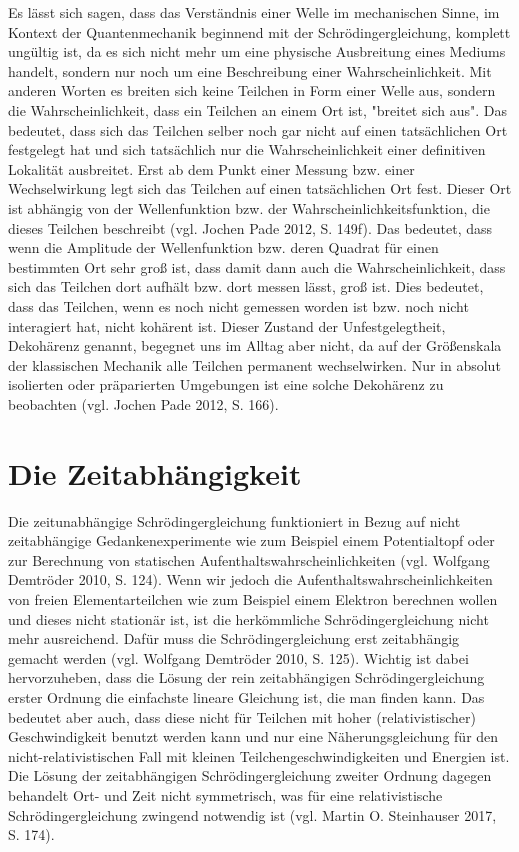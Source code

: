 \documentclass[12pt,oneside, a4paper]{scrbook}
\begin{document}
Es lässt sich sagen, dass das Verständnis einer Welle im mechanischen Sinne, im Kontext der Quantenmechanik beginnend mit der Schrödingergleichung, komplett ungültig ist, da es sich nicht mehr um eine physische Ausbreitung eines Mediums handelt, sondern nur noch um eine Beschreibung einer Wahrscheinlichkeit. 
Mit anderen Worten es breiten sich keine Teilchen in Form einer Welle aus, sondern die Wahrscheinlichkeit, dass ein Teilchen an einem Ort ist, "breitet sich aus". Das bedeutet, dass sich das Teilchen selber noch gar nicht auf einen tatsächlichen Ort festgelegt hat und sich tatsächlich nur die Wahrscheinlichkeit einer definitiven Lokalität ausbreitet. Erst ab dem Punkt einer Messung bzw. einer Wechselwirkung legt sich das Teilchen auf einen tatsächlichen Ort fest. Dieser Ort ist abhängig von der Wellenfunktion bzw. der Wahrscheinlichkeitsfunktion, die dieses Teilchen beschreibt (vgl. Jochen Pade 2012, S. 149f).
Das bedeutet, dass wenn die Amplitude der Wellenfunktion bzw. deren Quadrat für einen bestimmten Ort sehr groß ist, dass damit dann auch die Wahrscheinlichkeit, dass sich das Teilchen dort aufhält bzw. dort messen lässt, groß ist.
Dies bedeutet, dass das Teilchen, wenn es noch nicht gemessen worden ist bzw. noch nicht interagiert hat, nicht kohärent ist. Dieser Zustand der Unfestgelegtheit, Dekohärenz genannt, begegnet uns im Alltag aber nicht, da auf der Größenskala der klassischen Mechanik alle Teilchen permanent wechselwirken.
Nur in absolut isolierten oder präparierten Umgebungen ist eine solche Dekohärenz zu beobachten (vgl. Jochen Pade 2012, S. 166).

\section{Die Zeitabhängigkeit}

Die zeitunabhängige Schrödingergleichung funktioniert in Bezug auf nicht zeitabhängige Gedankenexperimente wie zum Beispiel einem Potentialtopf oder zur Berechnung von statischen Aufenthaltswahrscheinlichkeiten (vgl. Wolfgang Demtröder 2010, S. 124). Wenn wir jedoch die Aufenthaltswahrscheinlichkeiten von freien Elementarteilchen wie zum Beispiel einem Elektron berechnen wollen und dieses nicht stationär ist, ist die herkömmliche Schrödingergleichung nicht mehr ausreichend. Dafür muss die Schrödingergleichung erst zeitabhängig gemacht werden (vgl. Wolfgang Demtröder 2010, S. 125).
Wichtig ist dabei hervorzuheben, dass die Lösung der rein zeitabhängigen Schrödingergleichung erster Ordnung die einfachste lineare Gleichung ist, die man finden kann. Das bedeutet aber auch, dass diese nicht für Teilchen mit hoher (relativistischer) Geschwindigkeit benutzt werden kann und nur eine Näherungsgleichung für den nicht-relativistischen Fall mit kleinen Teilchengeschwindigkeiten und Energien ist.
Die Lösung der zeitabhängigen Schrödingergleichung zweiter Ordnung dagegen behandelt Ort- und Zeit nicht symmetrisch, was für eine relativistische Schrödingergleichung zwingend notwendig ist \newline (vgl. Martin O. Steinhauser 2017, S. 174).
\end{document}
